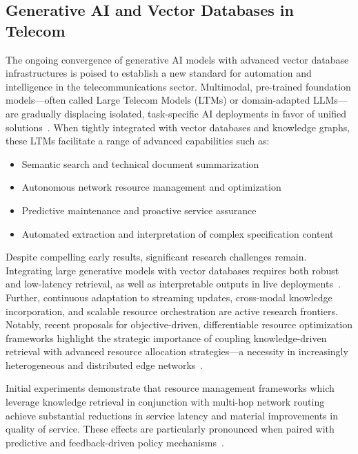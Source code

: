 \subsection{Generative AI and Vector Databases in Telecom}

The ongoing convergence of generative AI models with advanced vector database infrastructures is poised to establish a new standard for automation and intelligence in the telecommunications sector. Multimodal, pre-trained foundation models---often called Large Telecom Models (LTMs) or domain-adapted LLMs---are gradually displacing isolated, task-specific AI deployments in favor of unified solutions~\cite{ref51,ref511}. When tightly integrated with vector databases and knowledge graphs, these LTMs facilitate a range of advanced capabilities such as:

\begin{itemize}
    \item Semantic search and technical document summarization
    \item Autonomous network resource management and optimization
    \item Predictive maintenance and proactive service assurance
    \item Automated extraction and interpretation of complex specification content
\end{itemize}

Despite compelling early results, significant research challenges remain. Integrating large generative models with vector databases requires both robust and low-latency retrieval, as well as interpretable outputs in live deployments~\cite{ref20,ref21}. Further, continuous adaptation to streaming updates, cross-modal knowledge incorporation, and scalable resource orchestration are active research frontiers. Notably, recent proposals for objective-driven, differentiable resource optimization frameworks highlight the strategic importance of coupling knowledge-driven retrieval with advanced resource allocation strategies---a necessity in increasingly heterogeneous and distributed edge networks~\cite{ref48}.

Initial experiments demonstrate that resource management frameworks which leverage knowledge retrieval in conjunction with multi-hop network routing achieve substantial reductions in service latency and material improvements in quality of service. These effects are particularly pronounced when paired with predictive and feedback-driven policy mechanisms~\cite{ref48}.

